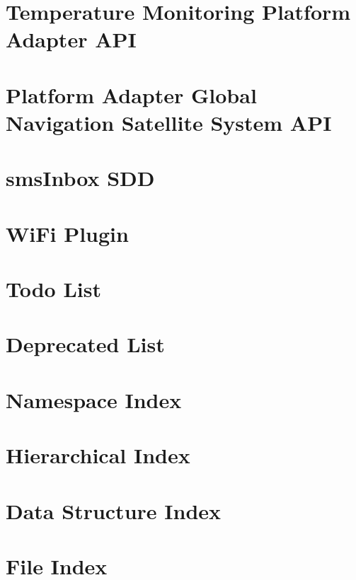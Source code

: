 \documentclass[twoside]{book}
\newcommand{\+}{\discretionary{\mbox{\scriptsize$\hookleftarrow$}}{}{}}
\begin{document}
\chapter{Temperature Monitoring Platform Adapter A\+PI}
\label{c_pa_temp}
\hypertarget{c_pa_temp}{}

\chapter{Platform Adapter Global Navigation Satellite System A\+PI}
\label{c_pa_gnss}
\hypertarget{c_pa_gnss}{}

\chapter{sms\+Inbox S\+DD}
\label{c_SDD_smsInbox}
\hypertarget{c_SDD_smsInbox}{}

\chapter{Wi\+Fi Plugin}
\label{external_proj_mainpage}
\hypertarget{external_proj_mainpage}{}

\chapter{Todo List}
\label{todo}
\hypertarget{todo}{}

\chapter{Deprecated List}
\label{deprecated}
\hypertarget{deprecated}{}

\chapter{Namespace Index}

\chapter{Hierarchical Index}

\chapter{Data Structure Index}

\chapter{File Index}

\end{document}
